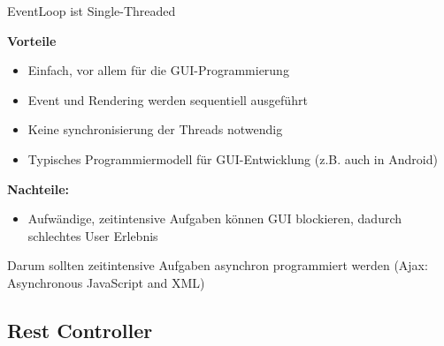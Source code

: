 EventLoop ist Single-Threaded

\textbf{Vorteile}
\begin{itemize}
	\item Einfach, vor allem für die GUI-Programmierung
	\item Event und Rendering werden sequentiell ausgeführt
	\item Keine synchronisierung der Threads notwendig
	\item Typisches Programmiermodell für GUI-Entwicklung (z.B. auch in Android)
\end{itemize}
\textbf{Nachteile:}
\begin{itemize}
	\item Aufwändige, zeitintensive Aufgaben können GUI blockieren, dadurch schlechtes User Erlebnis
\end{itemize}

Darum sollten zeitintensive Aufgaben asynchron programmiert werden (Ajax: Asynchronous JavaScript and XML)

\subsection{Rest Controller}

